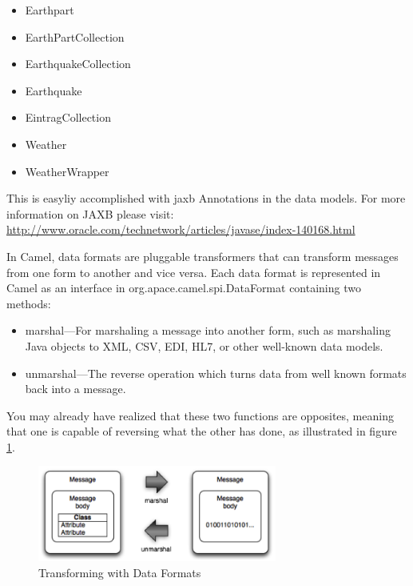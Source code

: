 \documentclass[11pt,english,ngerman, headsepline]{scrreprt}
\begin{document}
\begin{itemize}
  \item Earthpart
  \item EarthPartCollection
  \item EarthquakeCollection
  \item Earthquake
  \item EintragCollection
  \item Weather
  \item WeatherWrapper
\end{itemize}

This is easyliy accomplished with jaxb Annotations in the data models. For more
information on JAXB please visit: \\
\url{http://www.oracle.com/technetwork/articles/javase/index-140168.html}

In Camel, data formats are pluggable transformers that can transform messages
from one form to another and vice versa. Each data format is represented in
Camel as an interface in org.apace.camel.spi.DataFormat containing two methods:
\begin{itemize}
  \item marshal—For marshaling a message into another form, such as
marshaling Java objects to XML, CSV, EDI, HL7, or other well-known data
models.
\item unmarshal—The reverse operation which turns data from well known 
formats back into a message.
\end{itemize}
You may already have realized that these two functions are
opposites, meaning that one is capable of reversing what the other has done, as illustrated in
figure \ref{picMarshalling}. \cite{ibsen2010camel}



  \begin{figure}[h!]
	\begin{center}
	\includegraphics[width=0.7\textwidth]{pics/marshalling}
	\end{center}
	\caption{Transforming with Data Formats \cite{hohpe2003enterprise}}
	\label{picMarshalling} 
   \end{figure}
\end{document}

